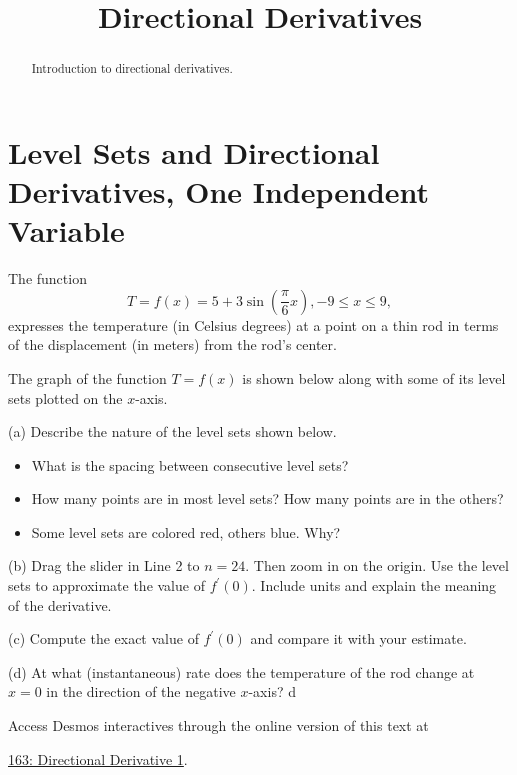 \documentclass{ximera}
\title{Directional Derivatives}
\begin{document}
\begin{abstract}
Introduction to directional derivatives.
\end{abstract}
\maketitle


\section{Level Sets and Directional Derivatives, One Independent Variable}

\begin{question}  \label{Qdsdfsddsf6bd}

The function
\[
   T = f(x) = 5 + 3\sin \left(   \frac{\pi}{6}x  \right)   , -9\leq x \leq 9 ,
\]
expresses the temperature (in Celsius degrees) at a point on a thin rod in terms of the displacement (in meters) from the rod's center.

The graph of the function $T=f(x)$ is shown below along with some of its level sets plotted on the $x$-axis.

(a) Describe the nature of the level sets shown below.


\begin{itemize}

\item{What is the spacing between consecutive level sets?}

\item{How many points are in most level sets? How many points are in the others?} 

\item{Some level sets are colored red, others blue. Why?}

\end{itemize}

(b) Drag the slider in Line 2 to $n=24$. Then zoom in on the origin. Use the level sets to approximate the value of $f^\prime(0)$. Include units and explain the meaning of the derivative.

(c) Compute the exact value of $f^\prime(0)$ and compare it with your estimate.

(d) At what (instantaneous) rate does the temperature of the rod change at $x=0$ in the direction of the negative $x$-axis? 
d
 
\begin{onlineOnly}
    \begin{center}
\end{center}
\end{onlineOnly}

Access Desmos interactives through the online version of this text at
 
\href{https://www.desmos.com/calculator/1ztmnpaymf}{163: Directional Derivative 1}.
\end{question}
\end{document}
